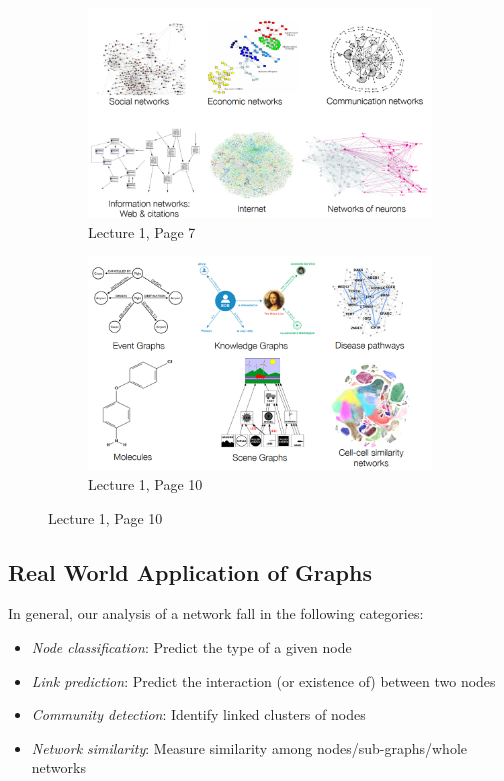 \begin{figure}[ht]
  \centering
  \begin{subfigure}{0.45\textwidth}
    \includegraphics[width=\textwidth]{img/l1_p7_networks1.PNG}
    \caption{Lecture 1, Page 7}
    \label{fig:1}
  \end{subfigure}
  \begin{subfigure}{0.45\textwidth}
    \includegraphics[width=\textwidth]{img/l1_p10_networks2.PNG}
    \caption{Lecture 1, Page 10}
    \label{fig:2}
  \end{subfigure}
\end{figure}

\subsection{Real World Application of Graphs}

In general, our analysis of a network fall in the following categories:

\begin{itemize}
    \item \textit{Node classification}: Predict the type of a given node
    
    \item \textit{Link prediction}: Predict the interaction (or existence of) between two nodes
    
    \item \textit{Community detection}: Identify linked clusters of nodes
    
    \item \textit{Network similarity}: Measure similarity among nodes/sub-graphs/whole networks
\end{itemize}

